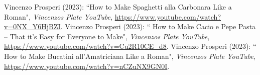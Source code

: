 
\begin{thebibliography}{100}
 Vincenzo Prosperi (2023): ``How to Make Spaghetti alla Carbonara Like a Roman", \emph{Vincenzos Plate YouTube}, \url{https://www.youtube.com/watch?v=0NX\_Y6HjBZI}.
 Vincenzo Prosperi (2023): `` How to Make Cacio e Pepe Pasta -- That it's Easy for Everyone to Make", \emph{Vincenzos Plate YouTube}, \url{https://www.youtube.com/watch?v=Cu2R10CE_d8}.
 Vincenzo Prosperi (2023): ``  How to Make Bucatini all'Amatriciana Like a Roman", \emph{Vincenzos Plate YouTube}, \url{https://www.youtube.com/watch?v=nCZuNX9GN0I}.
\end{thebibliography}